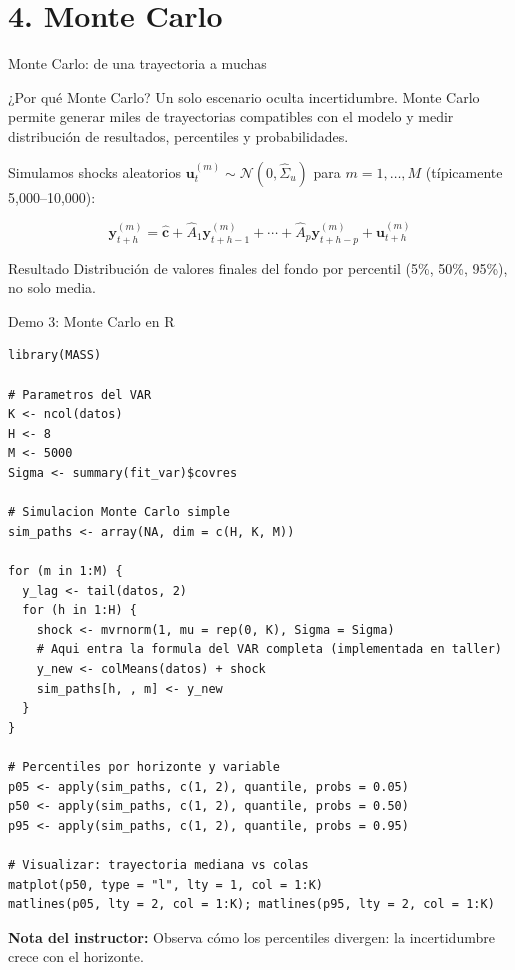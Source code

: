 \documentclass[10pt,aspectratio=169]{beamer}
\begin{document}
\section{4. Monte Carlo}

\begin{frame}{Monte Carlo: de una trayectoria a muchas}
\begin{block}{¿Por qué Monte Carlo?}
Un solo escenario oculta incertidumbre. Monte Carlo permite generar miles de trayectorias compatibles con el modelo y medir distribución de resultados, percentiles y probabilidades.
\end{block}

Simulamos shocks aleatorios $\bm u_t^{(m)} \sim \mathcal{N}(0,\hat \Sigma_u)$ para $m = 1,\ldots,M$ (típicamente 5,000--10,000):

\[
\bm y_{t+h}^{(m)} = \hat{\bm c} + \hat A_1 \bm y_{t+h-1}^{(m)} + \cdots + \hat A_p \bm y_{t+h-p}^{(m)} + \bm u_{t+h}^{(m)}
\]

\begin{block}{Resultado}
Distribución de valores finales del fondo por percentil (5\%, 50\%, 95\%), no solo media.
\end{block}
\end{frame}

\begin{frame}[fragile]{Demo 3: Monte Carlo en R}
\begin{lstlisting}
library(MASS)

# Parametros del VAR
K <- ncol(datos)
H <- 8
M <- 5000
Sigma <- summary(fit_var)$covres

# Simulacion Monte Carlo simple
sim_paths <- array(NA, dim = c(H, K, M))

for (m in 1:M) {
  y_lag <- tail(datos, 2)
  for (h in 1:H) {
    shock <- mvrnorm(1, mu = rep(0, K), Sigma = Sigma)
    # Aqui entra la formula del VAR completa (implementada en taller)
    y_new <- colMeans(datos) + shock
    sim_paths[h, , m] <- y_new
  }
}

# Percentiles por horizonte y variable
p05 <- apply(sim_paths, c(1, 2), quantile, probs = 0.05)
p50 <- apply(sim_paths, c(1, 2), quantile, probs = 0.50)
p95 <- apply(sim_paths, c(1, 2), quantile, probs = 0.95)

# Visualizar: trayectoria mediana vs colas
matplot(p50, type = "l", lty = 1, col = 1:K)
matlines(p05, lty = 2, col = 1:K); matlines(p95, lty = 2, col = 1:K)
\end{lstlisting}

\textbf{Nota del instructor:} Observa cómo los percentiles divergen: la incertidumbre crece con el horizonte.
\end{frame}
\end{document}
